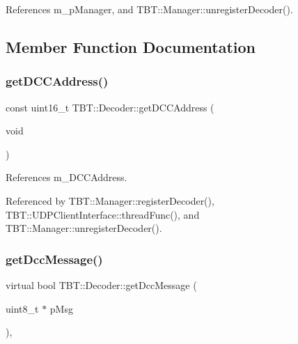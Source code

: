 References m\+\_\+p\+Manager, and T\+B\+T\+::\+Manager\+::unregister\+Decoder().



\subsection{Member Function Documentation}
\mbox{\label{classTBT_1_1Decoder_ad948e489ff1246effdfda3e68d693593_ad948e489ff1246effdfda3e68d693593}} 
\subsubsection{\texorpdfstring{get\+D\+C\+C\+Address()}{getDCCAddress()}}
{\footnotesize\ttfamily const uint16\+\_\+t T\+B\+T\+::\+Decoder\+::get\+D\+C\+C\+Address (\begin{DoxyParamCaption}\item[{void}]{ }\end{DoxyParamCaption})\hspace{0.3cm}{\ttfamily [inline]}}



References m\+\_\+\+D\+C\+C\+Address.



Referenced by T\+B\+T\+::\+Manager\+::register\+Decoder(), T\+B\+T\+::\+U\+D\+P\+Client\+Interface\+::thread\+Func(), and T\+B\+T\+::\+Manager\+::unregister\+Decoder().

\mbox{\label{classTBT_1_1Decoder_a71c25cd52e7f591ba1771ee0518735ba_a71c25cd52e7f591ba1771ee0518735ba}} 
\subsubsection{\texorpdfstring{get\+Dcc\+Message()}{getDccMessage()}}
{\footnotesize\ttfamily virtual bool T\+B\+T\+::\+Decoder\+::get\+Dcc\+Message (\begin{DoxyParamCaption}\item[{uint8\+\_\+t $\ast$}]{p\+Msg }\end{DoxyParamCaption})\hspace{0.3cm}{\ttfamily [inline]}, {\ttfamily [virtual]}}



